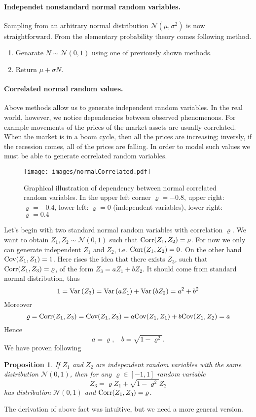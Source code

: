 \documentclass[a4paper,12pt, oneside]{book}
\newtheorem{prop}[thm]{Proposition}
\theoremstyle{definition}
\theoremstyle{remark}
\def\Var{{\rm Var}\,}
\def\Cov{{\hbox{Cov}}}
\def\Corr{{\hbox{Corr}}}
\begin{document}
\paragraph{Independet nonstandard normal random variables.} Sampling from an arbitrary normal distribution $\mathcal{N}(\mu, \sigma^2)$ is now straightforward. From the elementary probability theory comes following method.
\begin{enumerate}
 \item Genarate $N \sim \mathcal{N}(0,1)$ using one of previously shown methods.
 \item Return $\mu + \sigma N$.
\end{enumerate}

\paragraph{Correlated normal random values.} Above methods allow us to generate independent random variables. In the real world, however, we notice dependencies between observed phenomenons. For example movements of the prices of the market assets are usually correlated. When the market is in a boom cycle, then all the prices are increasing; inversly, if the recession comes, all of the prices are falling. In order to model such values we must be able to generate correlated random variables.

\begin{figure}[!ht]
\centering
 \texttt{[image: images/normalCorrelated.pdf]}
\caption{Graphical illustration of dependency between normal correlated random variables. In the upper left corner $\varrho = -0.8$, upper right: $\varrho = -0.4$, lower left: $\varrho = 0$ (independent variables), lower right: $\varrho = 0.4$}
\end{figure}

Let's begin with two standard normal random variables with correlation $\varrho$. We want to obtain $Z_1, Z_2 \sim \mathcal{N}(0,1)$ such that $\Corr(Z_1, Z_2) = \varrho$.  For now we only can generate independent $Z_1$ and $Z_2$, i.e. $\Corr(Z_1, Z_2) = 0$. On the other hand $\Cov(Z_1, Z_1) = 1$. Here rises the idea that there exists $Z_3$, such that $\Corr(Z_1, Z_3) = \varrho$, of the form $Z_3 = a Z_1 + b Z_2$. It should come from standard normal distribution, thus
\[ 1 = \Var(Z_3) = \Var( a Z_1) +  \Var(b Z_2) = a^2 + b^2 \]
Moreover
\[ \varrho = \Corr(Z_1, Z_3) = \Cov(Z_1, Z_3) = a\Cov(Z_1, Z_1) + b\Cov(Z_1, Z_2) = a \]
Hence
\[ a = \varrho,\ \ \ \ b = \sqrt{1 - \varrho^2}. \]
We have proven following
\begin{prop}
 If $Z_1$ and $Z_2$ are independent random variables with the same distribution $\mathcal{N}(0,1)$, then for any $\varrho \in [-1,1]$ random variable
 \[ Z_3 = \varrho Z_1 + \sqrt{1 - \varrho^2} Z_2 \]
 has distribution $\mathcal{N}(0,1)$ and $\Corr(Z_1, Z_3) = \varrho$.
\end{prop}
The derivation of above fact was intuitive, but we need a more general version.
\end{document}
